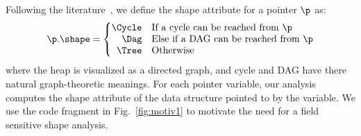 Following the
literature~\cite{Ghiya96,Sagiv96,marron06static},
we define the shape attribute for a pointer $\p$
as:
\begin{eqnarray*}
  \p.\shape = \left\{ \begin{array}{@{}rl@{}}
    \Cycle & \mbox{If a cycle can be reached from $\p$} \\ 
    \Dag & \mbox{Else if a DAG can be reached from $\p$} \\
    \Tree & \mbox{Otherwise} \\
  \end{array} \right.
\end{eqnarray*}
where the heap is visualized as a directed graph, and cycle
and DAG have there natural graph-theoretic meanings. For each
pointer variable, our analysis computes the shape attribute
of the data structure pointed to by the variable.  We use the
code fragment in Fig.~\ref{fig:motiv1} to motivate the need
for a field sensitive shape analysis.

